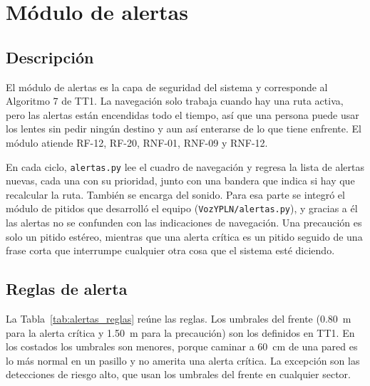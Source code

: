 \section{Módulo de alertas}
\label{sec:dev_alertas}

\subsection{Descripción}

El módulo de alertas es la capa de seguridad del sistema y corresponde al Algoritmo 7
de TT1. La navegación solo trabaja cuando hay una ruta activa, pero las alertas están
encendidas todo el tiempo, así que una persona puede usar los lentes sin pedir ningún
destino y aun así enterarse de lo que tiene enfrente. El módulo atiende RF-12, RF-20,
RNF-01, RNF-09 y RNF-12.

En cada ciclo, \texttt{alertas.py} lee el cuadro de navegación y regresa la lista de
alertas nuevas, cada una con su prioridad, junto con una bandera que indica si hay que
recalcular la ruta. También se encarga del sonido. Para esa parte se integró el módulo
de pitidos que desarrolló el equipo (\texttt{VozYPLN/alertas.py}), y gracias a él las
alertas no se confunden con las indicaciones de navegación. Una precaución es solo un
pitido estéreo, mientras que una alerta crítica es un pitido seguido de una frase corta
que interrumpe cualquier otra cosa que el sistema esté diciendo.

\subsection{Reglas de alerta}

La Tabla~\ref{tab:alertas_reglas} reúne las reglas. Los umbrales del frente (0.80~m
para la alerta crítica y 1.50~m para la precaución) son los definidos en TT1. En los
costados los umbrales son menores, porque caminar a 60~cm de una pared es lo más normal
en un pasillo y no amerita una alerta crítica. La excepción son las detecciones de
riesgo alto, que usan los umbrales del frente en cualquier sector.

